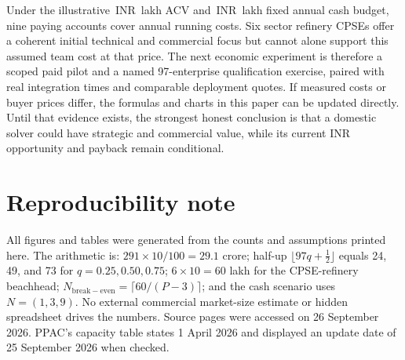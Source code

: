 \documentclass[11pt,a4paper]{article}
\newcommand{\inr}{\ifmmode\text{INR}\,\else INR\,\fi}
\newcommand{\lac}{\ifmmode\,\text{lakh}\else\,lakh\fi}
\begin{document}
Under the illustrative \inr10\lac{} ACV and \inr60\lac{} fixed annual cash budget, nine paying accounts cover annual running costs. Six sector refinery CPSEs offer a coherent initial technical and commercial focus but cannot alone support this assumed team cost at that price. The next economic experiment is therefore a scoped paid pilot and a named 97-enterprise qualification exercise, paired with real integration times and comparable deployment quotes. If measured costs or buyer prices differ, the formulas and charts in this paper can be updated directly. Until that evidence exists, the strongest honest conclusion is that a domestic solver could have strategic and commercial value, while its current INR opportunity and payback remain conditional.

\section*{Reproducibility note}

All figures and tables were generated from the counts and assumptions printed here. The arithmetic is: \(291\times10/100=29.1\) crore; half-up \(\lfloor97q+\tfrac12\rfloor\) equals 24, 49, and 73 for \(q=0.25,0.50,0.75\); \(6\times10=60\) lakh for the CPSE-refinery beachhead; \(N_{\mathrm{break-even}}=\lceil60/(P-3)\rceil\); and the cash scenario uses \(N=(1,3,9)\). No external commercial market-size estimate or hidden spreadsheet drives the numbers. Source pages were accessed on 26 September 2026. PPAC's capacity table states 1 April 2026 and displayed an update date of 25 September 2026 when checked.
\end{document}
